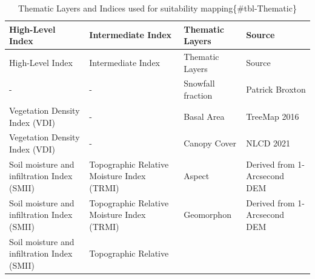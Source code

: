 \documentclass[
  number,
  preprint,
  3p,
  onecolumn]{elsarticle}
\begin{document}
\begin{longtable}[]{@{}
  >{\raggedright\arraybackslash}p{}
  >{\raggedright\arraybackslash}p{}
  >{\raggedright\arraybackslash}p{}
  >{\raggedright\arraybackslash}p{}@{}}
\caption{Thematic Layers and Indices used for suitability
mapping\{\#tbl-Thematic\}}\tabularnewline
\toprule\noalign{}
\begin{minipage}[b]{\linewidth}\raggedright
High-Level Index
\end{minipage} & \begin{minipage}[b]{\linewidth}\raggedright
Intermediate Index
\end{minipage} & \begin{minipage}[b]{\linewidth}\raggedright
Thematic Layers
\end{minipage} & \begin{minipage}[b]{\linewidth}\raggedright
Source
\end{minipage} \\
\midrule\noalign{}
\endfirsthead
\toprule\noalign{}
\begin{minipage}[b]{\linewidth}\raggedright
High-Level Index
\end{minipage} & \begin{minipage}[b]{\linewidth}\raggedright
Intermediate Index
\end{minipage} & \begin{minipage}[b]{\linewidth}\raggedright
Thematic Layers
\end{minipage} & \begin{minipage}[b]{\linewidth}\raggedright
Source
\end{minipage} \\
\midrule\noalign{}
\endhead
\bottomrule\noalign{}
\endlastfoot
- & - & Snowfall fraction & Patrick Broxton \\
Vegetation Density Index (VDI) & - & Basal Area & TreeMap 2016 \\
Vegetation Density Index (VDI) & - & Canopy Cover & NLCD 2021 \\
Soil moisture and infiltration Index (SMII) & Topographic Relative
Moisture Index (TRMI) & Aspect & Derived from 1-Arcsecond DEM \\
Soil moisture and infiltration Index (SMII) & Topographic Relative
Moisture Index (TRMI) & Geomorphon & Derived from 1-Arcsecond DEM \\
Soil moisture and infiltration Index (SMII) & Topographic Relative

\end{longtable}
\end{document}
